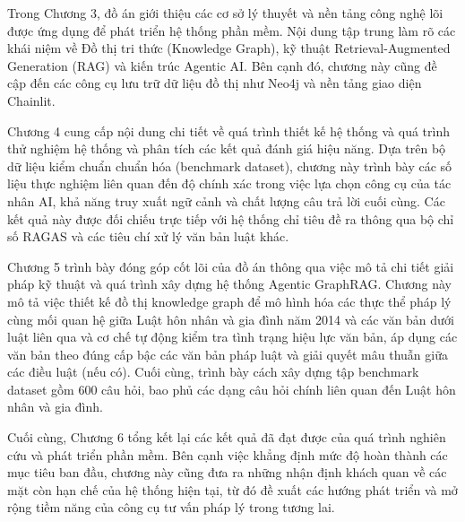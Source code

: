 \documentclass[../DoAn.tex]{subfiles}
\begin{document}
Trong Chương 3, đồ án giới thiệu các cơ sở lý thuyết và nền tảng công nghệ lõi được ứng dụng để phát triển hệ thống phần mềm. Nội dung tập trung làm rõ các khái niệm về Đồ thị tri thức (Knowledge Graph), kỹ thuật Retrieval-Augmented Generation (RAG) và kiến trúc Agentic AI. Bên cạnh đó, chương này cũng đề cập đến các công cụ lưu trữ dữ liệu đồ thị như Neo4j và nền tảng giao diện Chainlit.

Chương 4 cung cấp nội dung chi tiết về quá trình thiết kế hệ thống và quá trình thử nghiệm hệ thống và phân tích các kết quả đánh giá hiệu năng. Dựa trên bộ dữ liệu kiểm chuẩn chuẩn hóa (benchmark dataset), chương này trình bày các số liệu thực nghiệm liên quan đến độ chính xác trong việc lựa chọn công cụ của tác nhân AI, khả năng truy xuất ngữ cảnh và chất lượng câu trả lời cuối cùng. Các kết quả này được đối chiếu trực tiếp với hệ thống chỉ tiêu đề ra thông qua bộ chỉ số RAGAS và các tiêu chí xử lý văn bản luật khác.

Chương 5 trình bày đóng góp cốt lõi của đồ án thông qua việc mô tả chi tiết giải pháp kỹ thuật và quá trình xây dựng hệ thống Agentic GraphRAG. Chương này mô tả việc thiết kế đồ thị knowledge graph để mô hình hóa các thực thể pháp lý cùng mối quan hệ giữa Luật hôn nhân và gia đình năm 2014 và các văn bản dưới luật liên qua và cơ chế tự động kiểm tra tình trạng hiệu lực văn bản, áp dụng các văn bản theo đúng cấp bậc các văn bản pháp luật và giải quyết mâu thuẫn giữa các điều luật (nếu có). Cuối cùng, trình bày cách xây dựng tập benchmark dataset gồm 600 câu hỏi, bao phủ các dạng câu hỏi chính liên quan đến Luật hôn nhân và gia đình.

Cuối cùng, Chương 6 tổng kết lại các kết quả đã đạt được của quá trình nghiên cứu và phát triển phần mềm. Bên cạnh việc khẳng định mức độ hoàn thành các mục tiêu ban đầu, chương này cũng đưa ra những nhận định khách quan về các mặt còn hạn chế của hệ thống hiện tại, từ đó đề xuất các hướng phát triển và mở rộng tiềm năng của công cụ tư vấn pháp lý trong tương lai.
\end{document}
